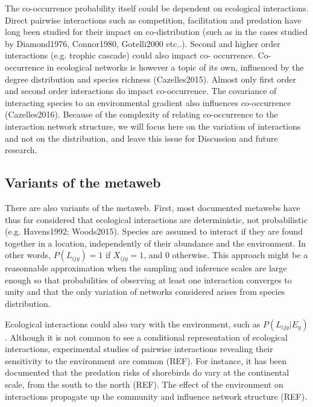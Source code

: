 \documentclass[12pt]{article}
\begin{document}
The co-occurrence probability itself could be dependent on ecological
interactions. Direct pairwise interactions such as competition, facilitation
and predation have long been studied for their impact on co-distribution (such
as in the cases studied by Diamond1976, Connor1980, Gotelli2000 etc..). Second
and higher order interactions (e.g. trophic cascade) could also impact co-
occurrence. Co-occurrence in ecological networks is however a topic of its
own, influenced by the degree distribution and species richness
(Cazelles2015). Almost only first order and second order interactions do
impact co-occurrence. The covariance of interacting species to an
environmental gradient also influences co-occurrence (Cazelles2016). Because
of the complexity of relating co-occurrence to the interaction network
structure, we  will focus here on the variation of interactions and not on the
distribution, and leave this issue for Discussion and future research.

\subsection*{Variants of the metaweb}

There are also variants of the metaweb. First, most documented metawebs have
thus far considered that ecological interactions are deterministic, not
probabilistic (e.g. Havens1992; Woods2015). Species are assumed to interact if
they are found together in a location, independently of their abundance and
the environment. In other words, $P(L_{ijy}) = 1$ if $X_{ijy} = 1$, and 0
otherwise. This approach might be a reasonnable approximation when the
sampling and inference scales are large enough so that probabilities of
observing at least one interaction converges to unity and that the only
variation of networks considered arises from species distribution.

Ecological interactions could also vary with the environment, such as
$P(L_{ijy} | E_y)$. Although it is not common to see a conditional
representation of ecological interactions, experimental studies of pairwise
interactions revealing their sensitivity to the environment are common (REF).
For instance, it has been documented that the predation risks of shorebirds do
vary at the continental scale, from the south to the north (REF). The effect
of the environment on interactions propagate up the community and influence
network structure (REF).

\newpage
\end{document}

